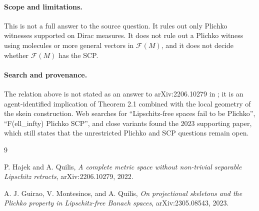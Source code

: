 \documentclass[11pt]{article}
\begin{document}
\paragraph{Scope and limitations.}
This is not a full answer to the source question.  It rules out only Plichko
witnesses supported on Dirac measures.  It does not rule out a Plichko witness
using molecules or more general vectors in \(\mathcal F(M)\), and it does not
decide whether \(\mathcal F(M)\) has the SCP.

\paragraph{Search and provenance.}
The relation above is not stated as an answer to arXiv:2206.10279 in
\cite{GMQ23}; it is an agent-identified implication of Theorem 2.1 combined
with the local geometry of the skein construction.  Web searches for
``Lipschitz-free spaces fail to be Plichko'', ``F(ell\_infty) Plichko SCP'',
and close variants found the 2023 supporting paper, which still states that
the unrestricted Plichko and SCP questions remain open.

\begin{thebibliography}{9}

P. Hajek and A. Quilis,
\emph{A complete metric space without non-trivial separable Lipschitz
retracts}, arXiv:2206.10279, 2022.

A. J. Guirao, V. Montesinos, and A. Quilis,
\emph{On projectional skeletons and the Plichko property in Lipschitz-free
Banach spaces}, arXiv:2305.08543, 2023.

\end{thebibliography}
\end{document}
